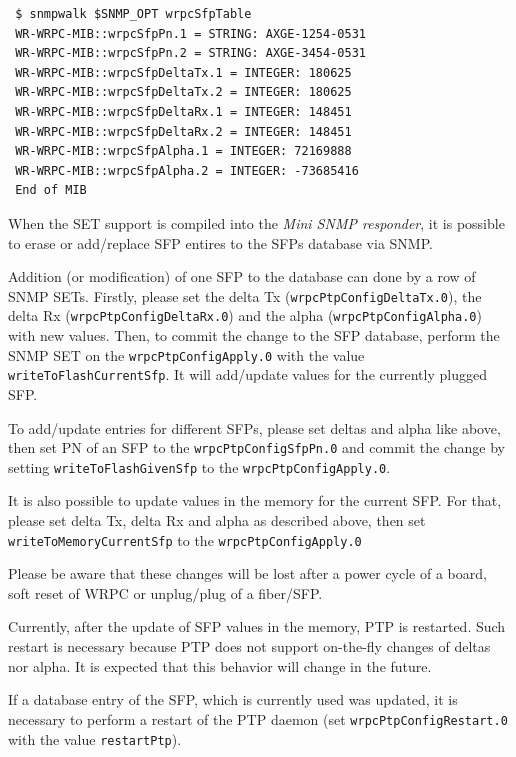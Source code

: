 \documentclass[a4paper, 12pt]{article}
\newcommand{\codeHook}[1]{\mbox{\ttfamily\MakeTextUppercase{#1}}}
\begin{document}
\begin{lstlisting}
 $ snmpwalk $SNMP_OPT wrpcSfpTable
 WR-WRPC-MIB::wrpcSfpPn.1 = STRING: AXGE-1254-0531
 WR-WRPC-MIB::wrpcSfpPn.2 = STRING: AXGE-3454-0531
 WR-WRPC-MIB::wrpcSfpDeltaTx.1 = INTEGER: 180625
 WR-WRPC-MIB::wrpcSfpDeltaTx.2 = INTEGER: 180625
 WR-WRPC-MIB::wrpcSfpDeltaRx.1 = INTEGER: 148451
 WR-WRPC-MIB::wrpcSfpDeltaRx.2 = INTEGER: 148451
 WR-WRPC-MIB::wrpcSfpAlpha.1 = INTEGER: 72169888
 WR-WRPC-MIB::wrpcSfpAlpha.2 = INTEGER: -73685416
 End of MIB
\end{lstlisting}
When the SET support is compiled into the \textit{Mini SNMP responder}, it is
possible to erase or add/replace SFP entires to the SFPs database via SNMP.

\begin{sloppypar} %
Addition (or modification) of one SFP to the database can done by a row of
SNMP SETs. Firstly, please set the delta Tx (\texttt{wrpcPtpConfigDeltaTx.0}), the
delta Rx (\texttt{wrpcPtpConfigDeltaRx.0}) and the alpha (\texttt{wrpcPtpConfigAlpha.0})
with new values.
Then, to commit the change to the SFP database, perform the SNMP SET on
the \texttt{wrpcPtpConfigApply.0} with the value \texttt{writeToFlashCurrentSfp}. It will
add/update values for the currently plugged SFP.
\end{sloppypar}

To add/update entries for different SFPs, please set deltas and alpha like
above, then set PN of an SFP to the \texttt{wrpcPtpConfigSfpPn.0} and commit
the change by setting \texttt{writeToFlashGivenSfp} to the \texttt{wrpcPtpConfigApply.0}.

It is also possible to update values in the memory for the current SFP.
For that, please set delta Tx, delta Rx and alpha as described above,
then set \texttt{writeToMemoryCurrentSfp} to the \texttt{wrpcPtpConfigApply.0}

Please be aware that these changes will be lost after a power cycle of a board,
soft reset of \codeHook{wrpc} or unplug/plug of a fiber/SFP.

Currently, after the update of SFP values in the memory, PTP is restarted.
Such restart is necessary because PTP does not support on-the-fly changes of
deltas nor alpha. It is expected that this behavior will change in the future.

If a database entry of the SFP, which is currently used was updated, it is
necessary to perform a restart of the PTP daemon
(set \texttt{wrpcPtpConfigRestart.0} with the value \texttt{restartPtp}).
\end{document}
